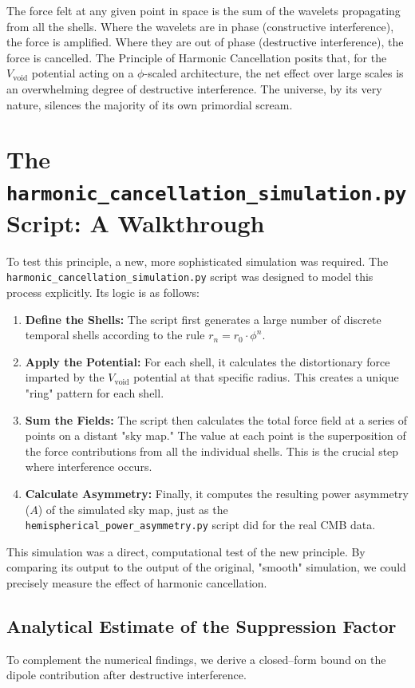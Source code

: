 \documentclass[12pt]{report}
\begin{document}
The force felt at any given point in space is the sum of the wavelets propagating from all the shells. Where the wavelets are in phase (constructive interference), the force is amplified. Where they are out of phase (destructive interference), the force is cancelled. The Principle of Harmonic Cancellation posits that, for the $V_{\text{void}}$ potential acting on a $\phi$-scaled architecture, the net effect over large scales is an overwhelming degree of destructive interference. The universe, by its very nature, silences the majority of its own primordial scream.

\section{The \texttt{harmonic\_cancellation\_simulation.py} Script: A Walkthrough}
To test this principle, a new, more sophisticated simulation was required. The \texttt{harmonic\_cancellation\_simulation.py} script was designed to model this process explicitly.
Its logic is as follows:
\begin{enumerate}
    \item \textbf{Define the Shells:} The script first generates a large number of discrete temporal shells according to the rule $r_n = r_0 \cdot \phi^n$.
    \item \textbf{Apply the Potential:} For each shell, it calculates the distortionary force imparted by the $V_{\text{void}}$ potential at that specific radius. This creates a unique "ring" pattern for each shell.
    \item \textbf{Sum the Fields:} The script then calculates the total force field at a series of points on a distant "sky map." The value at each point is the superposition of the force contributions from all the individual shells. This is the crucial step where interference occurs.
    \item \textbf{Calculate Asymmetry:} Finally, it computes the resulting power asymmetry ($A$) of the simulated sky map, just as the \texttt{hemispherical\_power\_asymmetry.py} script did for the real CMB data.
\end{enumerate}
This simulation was a direct, computational test of the new principle. By comparing its output to the output of the original, "smooth" simulation, we could precisely measure the effect of harmonic cancellation.

\subsection{Analytical Estimate of the Suppression Factor}\label{subsec:harmonic_analytic}
To complement the numerical findings, we derive a closed--form bound on the dipole contribution after destructive interference.
\end{document}

